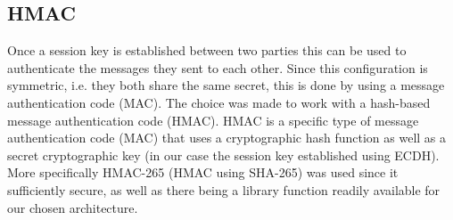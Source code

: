 \subsection{HMAC} 
\label{subsec:hmac}

Once a session key is established between two parties this can be used to authenticate the messages they sent to each other. Since this configuration is symmetric, i.e. they both share the same secret, this is done by using a message authentication code (MAC). The choice was made to work with a hash-based message authentication code (HMAC). HMAC is a specific type of message authentication code (MAC) that uses a cryptographic hash function as well as a secret cryptographic key (in our case the session key established using ECDH). More specifically HMAC-265 (HMAC using SHA-265) was used since it sufficiently secure, as well as there being a library function readily available for our chosen architecture.